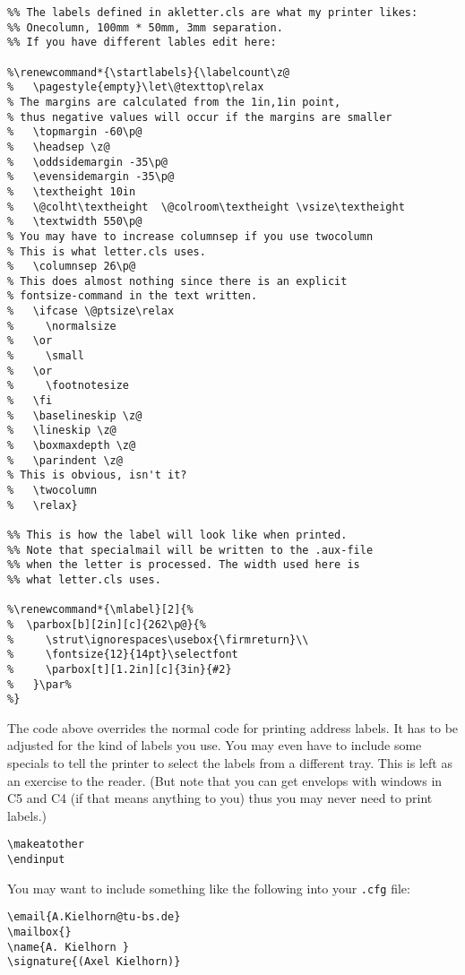 \documentclass[a4paper]{article}
\begin{document}
\begin{verbatim}
%% The labels defined in akletter.cls are what my printer likes:
%% Onecolumn, 100mm * 50mm, 3mm separation.
%% If you have different lables edit here:

%\renewcommand*{\startlabels}{\labelcount\z@
%   \pagestyle{empty}\let\@texttop\relax
% The margins are calculated from the 1in,1in point,
% thus negative values will occur if the margins are smaller
%   \topmargin -60\p@
%   \headsep \z@
%   \oddsidemargin -35\p@
%   \evensidemargin -35\p@
%   \textheight 10in
%   \@colht\textheight	\@colroom\textheight \vsize\textheight
%   \textwidth 550\p@
% You may have to increase columnsep if you use twocolumn
% This is what letter.cls uses.
%   \columnsep 26\p@
% This does almost nothing since there is an explicit 
% fontsize-command in the text written.
%   \ifcase \@ptsize\relax
%     \normalsize
%   \or
%     \small
%   \or
%     \footnotesize
%   \fi
%   \baselineskip \z@
%   \lineskip \z@
%   \boxmaxdepth \z@
%   \parindent \z@
% This is obvious, isn't it?
%   \twocolumn
%   \relax}

%% This is how the label will look like when printed.
%% Note that specialmail will be written to the .aux-file
%% when the letter is processed. The width used here is
%% what letter.cls uses. 

%\renewcommand*{\mlabel}[2]{%
%  \parbox[b][2in][c]{262\p@}{%
%     \strut\ignorespaces\usebox{\firmreturn}\\
%     \fontsize{12}{14pt}\selectfont
%     \parbox[t][1.2in][c]{3in}{#2}
%   }\par%
%}
\end{verbatim}

The code above overrides the normal code for printing address labels. 
It has to be adjusted for the kind of labels you use. You may even 
have to include some specials to tell the printer to select the labels 
from a different tray. This is left as an exercise to the reader. (But 
note that you can get envelops with windows in C5 and C4 (if that 
means anything to you) thus you may never need to print labels.)

\begin{verbatim}
\makeatother
\endinput
\end{verbatim}

You may want to include something like the following into your
\texttt{.cfg} file:

\begin{verbatim}
\email{A.Kielhorn@tu-bs.de}
\mailbox{}
\name{A. Kielhorn } 
\signature{(Axel Kielhorn)}

\end{verbatim}
\end{document}

